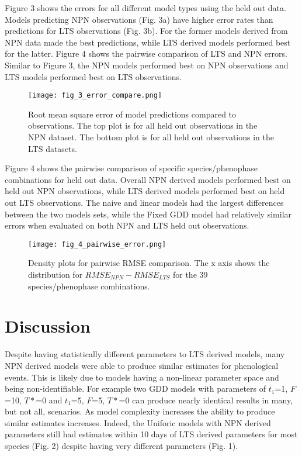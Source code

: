 \documentclass[fleqn,10pt,lineno]{wlpeerj} %
\begin{document}
Figure 3 shows the errors for all different model types using the held out data. Models predicting NPN observations (Fig. 3a) have higher error rates than predictions for LTS observations (Fig. 3b). For the former models derived from NPN data made the best predictions, while LTS derived models performed best for the latter. Figure 4 shows the pairwise comparison of LTS and NPN errors. Similar to Figure 3, the NPN models performed best on NPN observations and LTS models performed best on LTS observations.

\begin{figure}
	\centering
		\texttt{[image: fig\_3\_error\_compare.png]}
	\caption{Root mean square error of model predictions compared to observations. The top plot is for all held out observations in the NPN dataset. The bottom plot is for all held out observations in the LTS datasets.}
\end{figure}

Figure 4 shows the pairwise comparison of specific species/phenophase combinations for held out data. Overall NPN derived models performed best on held out NPN observations, while LTS derived models performed best on held out LTS observations. The naive and linear models had the largest differences between the two models sets, while the Fixed GDD model had relatively similar errors when evaluated on both NPN and LTS held out observations.  

\begin{figure}
	\centering
		\texttt{[image: fig\_4\_pairwise\_error.png]}
	\caption{Density plots for pairwise RMSE comparison. The x axis shows the distribution for $RMSE_{NPN} - RMSE_{LTS}$  for the  39 species/phenophase combinations.}
\end{figure}


\section*{Discussion}

Despite having statistically different parameters to LTS derived models, many NPN derived models were able to produce similar estimates for phenological events. This is likely due to models having a non-linear parameter space and being non-identifiable. For example two GDD models with parameters of $t_{1}$=1, $F$=10, $T*$=0 and $t_{1}$=5, $F$=5, $T*$=0 can produce nearly identical results in many, but not all, scenarios. As model complexity increases the ability to produce similar estimates increases. Indeed, the Uniforic models with NPN derived parameters still had estimates within 10 days of LTS derived parameters for most species (Fig. 2) despite having very different parameters (Fig. 1). 
\end{document}
